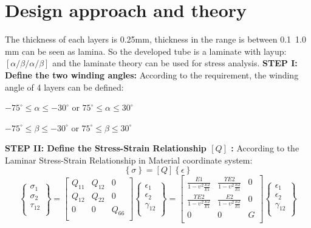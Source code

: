 \documentclass[12pt]{article}
\begin{document}
\section{Design approach and theory}
\noindent The thickness of each layers is 0.25mm, thickness in the range is between 0.1~1.0 mm can be seen as lamina. So the developed tube is a laminate with layup: $[\alpha /\beta /\alpha /\beta ]$ and the laminate theory can be used for stress analysis.\newline\newline
\noindent \textbf{STEP I: Define the two winding angles:}\newline
\noindent According to the requirement, the winding angle of 4 layers can be defined:\newline
\begin{center}
$-75^{\circ} \leq \alpha \leq -30^{\circ}$ or $75^{\circ} \leq \alpha \leq 30^{\circ}$\end{center}
\begin{center}
$-75^{\circ} \leq \beta \leq -30^{\circ}$ or $75^{\circ} \leq \beta \leq 30^{\circ}$
\end{center}
\noindent \textbf{STEP II: Define the Stress-Strain Relationship $\left[ Q \right]$ :}\newline
According to the Laminar Stress-Strain Relationship in Material coordinate system: \newline$$\left\{ \sigma \right\} = \left[Q \right] \left\{ \epsilon \right\}$$
$$\left\{ \begin{matrix}
    \sigma_1  \\
    \sigma_2  \\
    \tau_{12}  \\
    \end{matrix} \right\} = \left[\begin{matrix}
		Q_{11} & Q_{12} & 0 \\
		Q_{12} & Q_{22} & 0 \\
		0 & 0 & Q_{66} \\
		\end{matrix} \right] \left\{ \begin{matrix}
			\epsilon_1  \\
			\epsilon_2  \\
			\gamma_{12}  \\
			\end{matrix} \right\} = \left[\begin{matrix}
				\frac{E1}{1-\upsilon^2\frac{E2}{E1}} & \frac{\Upsilon E2}{1-\upsilon^2\frac{E2}{E1}} & 0 \\
				\frac{\Upsilon E2}{1-\upsilon^2\frac{E2}{E1}} & \frac{E2}{1-\upsilon^2\frac{E2}{E1}} & 0 \\
				0 & 0 & G \\
				\end{matrix} \right] \left\{ \begin{matrix}
					\epsilon_1  \\
					\epsilon_2  \\
					\gamma_{12}  \\
					\end{matrix} \right\}$$
\end{document}
